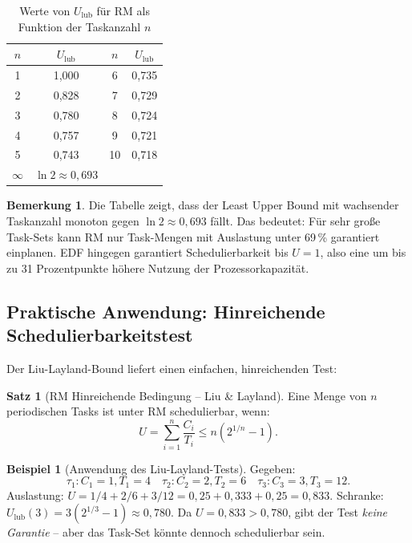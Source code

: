 ﻿\documentclass[a4paper,12pt]{report}
\theoremstyle{definition}
\newtheorem{beispiel}{Beispiel}[chapter]
\newtheorem{satz}{Satz}[chapter]
\newtheorem{bemerkung}{Bemerkung}[chapter]
\begin{document}
\begin{table}[H]
	\centering
	\caption{Werte von $U_{\text{lub}}$ für RM als Funktion der Taskanzahl $n$}
	\label{tab:rm_lub}
	\begin{tabular}{cc|cc}
		\toprule
		$n$ & $U_{\text{lub}}$ & $n$ & $U_{\text{lub}}$ \\
		\midrule
		1   & 1{,}000          & 6   & 0{,}735          \\
		2   & 0{,}828          & 7   & 0{,}729          \\
		3   & 0{,}780          & 8   & 0{,}724          \\
		4   & 0{,}757          & 9   & 0{,}721          \\
		5   & 0{,}743          & 10  & 0{,}718          \\
		$\infty$ & $\ln 2 \approx 0{,}693$ & & \\
		\bottomrule
	\end{tabular}
\end{table}

\begin{bemerkung}
	Die Tabelle zeigt, dass der Least Upper Bound mit wachsender Taskanzahl
	monoton gegen $\ln 2 \approx 0{,}693$ fällt. Das bedeutet: Für sehr große
	Task-Sets kann RM nur Task-Mengen mit Auslastung unter 69\,\% garantiert
	einplanen. EDF hingegen garantiert Schedulierbarkeit bis $U = 1$, also eine
	um bis zu 31 Prozentpunkte höhere Nutzung der Prozessorkapazität.
\end{bemerkung}

\subsection{Praktische Anwendung: Hinreichende Schedulierbarkeitstest}

Der Liu-Layland-Bound liefert einen einfachen, hinreichenden Test:

\begin{satz}[RM Hinreichende Bedingung -- Liu \& Layland]
	\label{satz:rm_suf}
	Eine Menge von $n$ periodischen Tasks ist unter RM schedulierbar, wenn:
	\[
		U = \sum_{i=1}^{n} \frac{C_i}{T_i} \leq n(2^{1/n} - 1).
	\]
\end{satz}

\begin{beispiel}[Anwendung des Liu-Layland-Tests]
	Gegeben:
	\[
		\tau_1: C_1=1, T_1=4 \quad \tau_2: C_2=2, T_2=6 \quad \tau_3: C_3=3, T_3=12.
	\]
	Auslastung: $U = 1/4 + 2/6 + 3/12 = 0{,}25 + 0{,}333 + 0{,}25 = 0{,}833$.
	Schranke: $U_{\text{lub}}(3) = 3(2^{1/3}-1) \approx 0{,}780$.
	Da $U = 0{,}833 > 0{,}780$, gibt der Test \emph{keine Garantie} -- aber das
	Task-Set könnte dennoch schedulierbar sein.
\end{beispiel}
\end{document}
